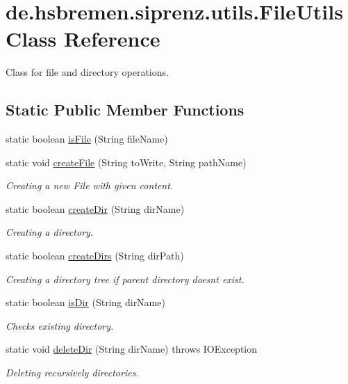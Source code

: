 \hypertarget{classde_1_1hsbremen_1_1siprenz_1_1utils_1_1FileUtils}{}\section{de.\+hsbremen.\+siprenz.\+utils.\+File\+Utils Class Reference}
\label{classde_1_1hsbremen_1_1siprenz_1_1utils_1_1FileUtils}


Class for file and directory operations.  


\subsection*{Static Public Member Functions}
\begin{DoxyCompactItemize}
\item 
static boolean \hyperlink{classde_1_1hsbremen_1_1siprenz_1_1utils_1_1FileUtils_a9b43144fe6eeb361624d509d4bf500ce}{is\+File} (String file\+Name)
\item 
static void \hyperlink{classde_1_1hsbremen_1_1siprenz_1_1utils_1_1FileUtils_a101a622a781056e119c9ee1de1c4cf94}{create\+File} (String to\+Write, String path\+Name)
\begin{DoxyCompactList}\small\item\em Creating a new File with given content. \end{DoxyCompactList}\item 
static boolean \hyperlink{classde_1_1hsbremen_1_1siprenz_1_1utils_1_1FileUtils_aca7379519688339682d22353d724cb88}{create\+Dir} (String dir\+Name)
\begin{DoxyCompactList}\small\item\em Creating a directory. \end{DoxyCompactList}\item 
static boolean \hyperlink{classde_1_1hsbremen_1_1siprenz_1_1utils_1_1FileUtils_a5aec54ce389ce7d4e2dadad1aff0b0bc}{create\+Dirs} (String dir\+Path)
\begin{DoxyCompactList}\small\item\em Creating a directory tree if parent directory doesn\textquotesingle{}t exist. \end{DoxyCompactList}\item 
static boolean \hyperlink{classde_1_1hsbremen_1_1siprenz_1_1utils_1_1FileUtils_a22c3f496d3e6878705542d37bd419b81}{is\+Dir} (String dir\+Name)
\begin{DoxyCompactList}\small\item\em Checks existing directory. \end{DoxyCompactList}\item 
static void \hyperlink{classde_1_1hsbremen_1_1siprenz_1_1utils_1_1FileUtils_a6ab1fc80abb5196aa246d9026a75ed7a}{delete\+Dir} (String dir\+Name)  throws I\+O\+Exception 
\begin{DoxyCompactList}\small\item\em Deleting recursively directories. \end{DoxyCompactList}\end{DoxyCompactItemize}


